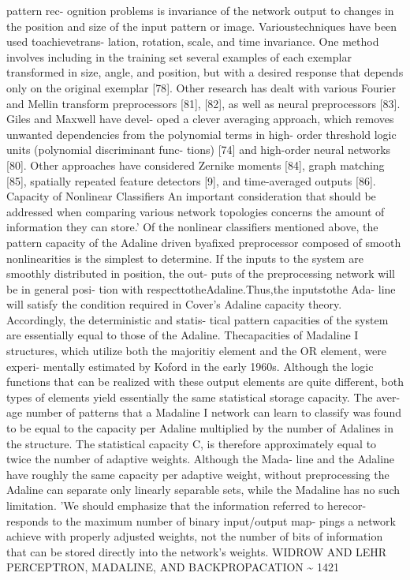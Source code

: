 pattern rec- ognition problems is invariance of the network output to
changes in the position and size of the input pattern or image.
Varioustechniques have been used toachievetrans- lation, rotation,
scale, and time invariance. One method involves including in the
training set several examples of each exemplar transformed in size,
angle, and position, but with a desired response that depends only on
the original exemplar {[}78{]}. Other research has dealt with various
Fourier and Mellin transform preprocessors {[}81{]}, {[}82{]}, as well
as neural preprocessors {[}83{]}. Giles and Maxwell have devel- oped a
clever averaging approach, which removes unwanted dependencies from the
polynomial terms in high- order threshold logic units (polynomial
discriminant func- tions) {[}74{]} and high-order neural networks
{[}80{]}. Other approaches have considered Zernike moments {[}84{]},
graph matching {[}85{]}, spatially repeated feature detectors {[}9{]},
and time-averaged outputs {[}86{]}. Capacity of Nonlinear Classifiers An
important consideration that should be addressed when comparing various
network topologies concerns the amount of information they can store.'
Of the nonlinear classifiers mentioned above, the pattern capacity of
the Adaline driven byafixed preprocessor composed of smooth
nonlinearities is the simplest to determine. If the inputs to the system
are smoothly distributed in position, the out- puts of the preprocessing
network will be in general posi- tion with respecttotheAdaline.Thus,the
inputstothe Ada- line will satisfy the condition required in Cover's
Adaline capacity theory. Accordingly, the deterministic and statis-
tical pattern capacities of the system are essentially equal to those of
the Adaline. Thecapacities of Madaline I structures, which utilize both
the majoritiy element and the OR element, were experi- mentally
estimated by Koford in the early 1960s. Although the logic functions
that can be realized with these output elements are quite different,
both types of elements yield essentially the same statistical storage
capacity. The aver- age number of patterns that a Madaline I network can
learn to classify was found to be equal to the capacity per Adaline
multiplied by the number of Adalines in the structure. The statistical
capacity C, is therefore approximately equal to twice the number of
adaptive weights. Although the Mada- line and the Adaline have roughly
the same capacity per adaptive weight, without preprocessing the Adaline
can separate only linearly separable sets, while the Madaline has no
such limitation. 'We should emphasize that the information referred to
herecor- responds to the maximum number of binary input/output map-
pings a network achieve with properly adjusted weights, not the number
of bits of information that can be stored directly into the network's
weights. WIDROW AND LEHR PERCEPTRON, MADALINE, AND BACKPROPACATION
\textasciitilde{} \textsubscript{} 1421

